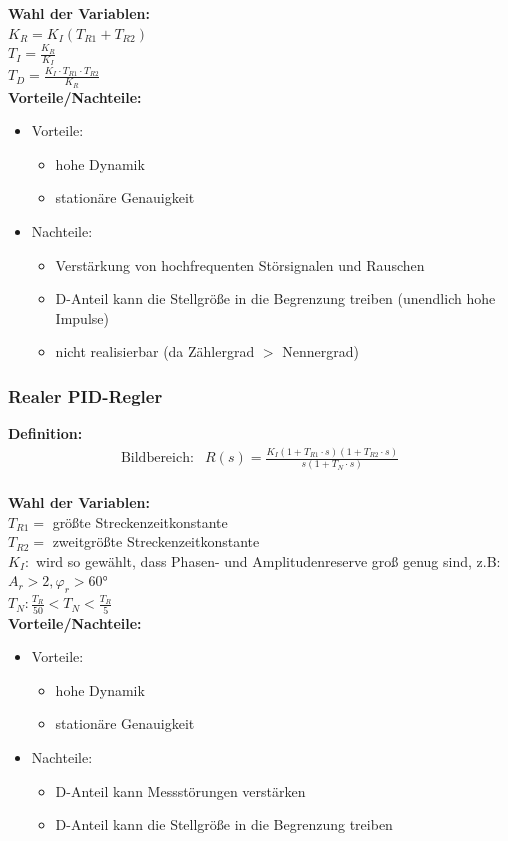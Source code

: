 \documentclass[10pt,a4paper]{article}
\begin{document}
\textbf{Wahl der Variablen:} \\
$K_R = K_I(T_{R1} + T_{R2})$  \\
$T_I = \frac{K_R}{K_I}$ \\
$T_D = \frac{K_I ⋅ T_{R1} ⋅ T_{R2}}{K_R}$ \\

\textbf{Vorteile/Nachteile:}
\begin{itemize}
	\item Vorteile:
	\begin{itemize}
		\item hohe Dynamik
		\item stationäre Genauigkeit
	\end{itemize}
	\item Nachteile:
	\begin{itemize}
		\item Verstärkung von hochfrequenten Störsignalen und Rauschen
		\item D-Anteil kann die Stellgröße in die Begrenzung treiben (unendlich hohe Impulse)
		\item nicht realisierbar (da Zählergrad $>$ Nennergrad)
	\end{itemize}
\end{itemize}

\subsubsection{Realer PID-Regler}
\textbf{Definition:}
$$
	\begin{array}{ll}
	\text{Bildbereich:} & R(s) = \frac{K_I(1 + T_{R1} ⋅ s)(1 + T_{R2} ⋅ s)}{s(1 + T_N ⋅ s)}
	\end{array}
$$ \\

\textbf{Wahl der Variablen:} \\
$T_{R1} =$ größte Streckenzeitkonstante  \\
$T_{R2} =$ zweitgrößte Streckenzeitkonstante \\
$K_I:$ wird so gewählt, dass Phasen- und Amplitudenreserve groß genug sind, z.B: $A_r > 2, \varphi_r > 60°$ \\
$T_N: \frac{T_R}{50} < T_N < \frac{T_R}{5}$ \\

\textbf{Vorteile/Nachteile:}
\begin{itemize}
	\item Vorteile:
	\begin{itemize}
		\item hohe Dynamik
		\item stationäre Genauigkeit
	\end{itemize}
	\item Nachteile:
	\begin{itemize}
		\item D-Anteil kann Messstörungen verstärken
		\item D-Anteil kann die Stellgröße in die Begrenzung treiben 
	\end{itemize}
\end{itemize}
\end{document}
